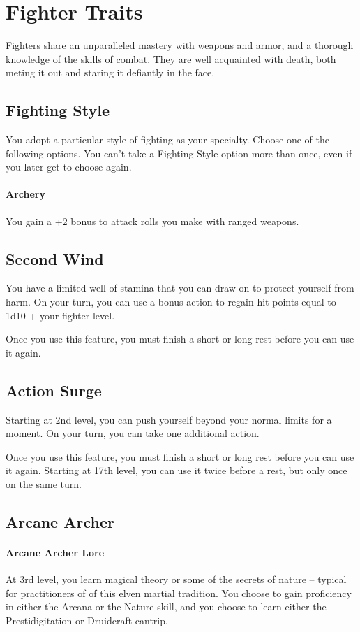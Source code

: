 \documentclass[letterpaper,openany,oneside,twocolumn]{book}
\begin{document}
\section*{Fighter Traits}
Fighters share an unparalleled mastery with weapons and armor, and a thorough knowledge of the skills of combat. They are well acquainted with death, both meting it out and staring it defiantly in the face.
\subsection*{Fighting Style}
You adopt a particular style of fighting as your specialty. Choose one of the following options. You can't take a Fighting Style option more than once, even if you later get to choose again.
\paragraph*{Archery}
You gain a +2 bonus to attack rolls you make with ranged weapons.
\subsection*{Second Wind}
You have a limited well of stamina that you can draw on to protect yourself from harm. On your turn, you can use a bonus action to regain hit points equal to 1d10 + your fighter level.

Once you use this feature, you must finish a short or long rest before you can use it again.
\subsection*{Action Surge}
Starting at 2nd level, you can push yourself beyond your normal limits for a moment. On your turn, you can take one additional action.

Once you use this feature, you must finish a short or long rest before you can use it again. Starting at 17th level, you can use it twice before a rest, but only once on the same turn.
\subsection*{Arcane Archer}
\paragraph*{Arcane Archer Lore}
At 3rd level, you learn magical theory or some of the secrets of nature – typical for practitioners of of this elven martial tradition. You choose to gain proficiency in either the Arcana or the Nature skill, and you choose to learn either the Prestidigitation or Druidcraft cantrip.
\end{document}
